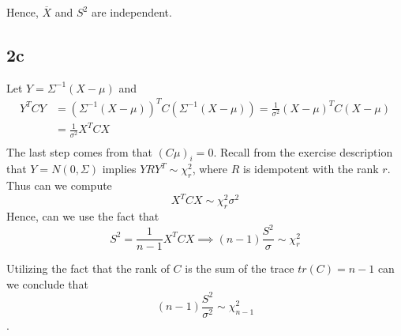 \documentclass{article}
\theoremstyle{remark}
\begin{document}
Hence, $\overline{X} $ and $S^{2}$ are independent.

\newpage
\subsection*{2c}%
\label{sec:2c}


Let $\displaystyle Y = \Sigma ^{-1} \left( X- \mu  \right)$ and \[
    \begin{split}
Y^{T} C Y & = \left( \Sigma ^{-1} \left( X- \mu  \right) \right) ^{T} C \left( \Sigma ^{-1} \left( X- \mu  \right) \right)
= \frac{1}{\sigma ^2}   \left( X- \mu  \right)^{T}  C   \left( X- \mu  \right)   \\
&= \frac{1}{\sigma^2 } X^{T} C X \\
    \end{split}
\]
The last step comes from that $\left( C \mu  \right)_i  = 0$. Recall from the exercise description that $Y = N\left( 0, \Sigma
\right)$ implies $Y R Y^{T} \sim  \chi _{r}^{2}$, where $R$  is idempotent with the rank $r$. Thus can we compute  \[
X^{T} C X \sim \chi _{r}^{2}\sigma ^{2}
\]
Hence, can we use the fact that \[
S^{2} = \frac{1}{n-1} X^{T}C X \implies \left( n -1 \right)\frac{S^{2}}{\sigma } \sim \chi _{r}^{2}
\]

Utilizing the fact that the rank of $C$  is the sum of the trace $\displaystyle tr\left( C \right) = n-1$ can we
conclude that \[
\left( n -1 \right)\frac{S^{2}}{\sigma^{2} } \sim \chi _{n-1}^{2}
\].





\end{document}
